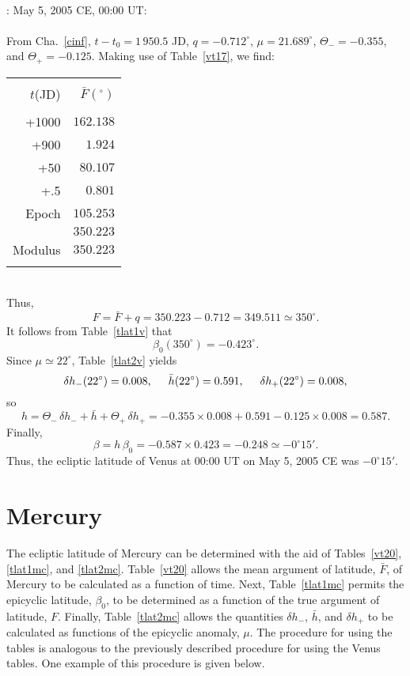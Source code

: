 ~\\
: May 5, 2005 CE, 00:00 UT:\\
~\\
From Cha.~\ref{cinf}, $t-t_0=1\,950.5$ JD, 
$q= -0.712^\circ$,  $\mu= 21.689^\circ$, $\Theta_-=-0.355$, and
$\Theta_+ = -0.125$.
 Making use of
Table~\ref{vt17}, we find:\\
\begin{tabular}{rr}
&\\
$t$(JD) & $\bar{F}(^\circ)$\\[-2ex]
&\\
+1000 & $162.138$ \\
+900 & $1.924$\\
+50 & $80.107$ \\
+.5 & $0.801$\\
Epoch & $105.253$ \\\cline{2-2}
&$350.223$ \\\cline{2-2}
Modulus & $350.223$ \\ 
&\\
\end{tabular}\\
Thus,
$$
F = \bar{F} + q = 350.223-0.712 = 349.511\simeq 350^\circ.
$$
It follows from Table~\ref{tlat1v} that
$$
\beta_0(350^\circ) = -0.423^\circ.
$$
Since $\mu\simeq 22^\circ$, Table~\ref{tlat2v} yields
$$
\delta h_-(22^\circ) = 0.008,\mbox{\hspace{0.5cm}}\bar{h}(22^\circ)=0.591, \mbox{\hspace{0.5cm}}\delta h_+(22^\circ) = 0.008,
$$
so
$$
h = \Theta_-\,\delta h_- + \bar{h}+\Theta_+\,\delta h_+ = -0.355\times 0.008+0.591-0.125\times 0.008 = 0.587.
$$
Finally,
$$
\beta = h\,\beta_0 =- 0.587\times 0.423 = -0.248\simeq -0^\circ 15'.
$$
Thus,
the ecliptic latitude of Venus at 00:00 UT on May 5, 2005 CE was $-0^\circ 15'$.

\section{Mercury}
The ecliptic latitude of Mercury can be determined with the aid of Tables~\ref{vt20}, \ref{tlat1mc}, and \ref{tlat2mc}. Table~\ref{vt20} allows
the mean argument of latitude, $\bar{F}$, of Mercury to be calculated as a function of
time. Next, Table~\ref{tlat1mc} permits the epicyclic  latitude, $\beta_0$, to
be determined as a function of the true argument of latitude, $F$. Finally, Table~\ref{tlat2mc} allows the quantities
$\delta h_-$, $\bar{h}$, and $\delta h_+$ to be calculated as functions of the epicyclic
anomaly, $\mu$. 
The procedure for using the tables is analogous to the previously
described procedure for using the Venus tables.
One example of this procedure is given below.

